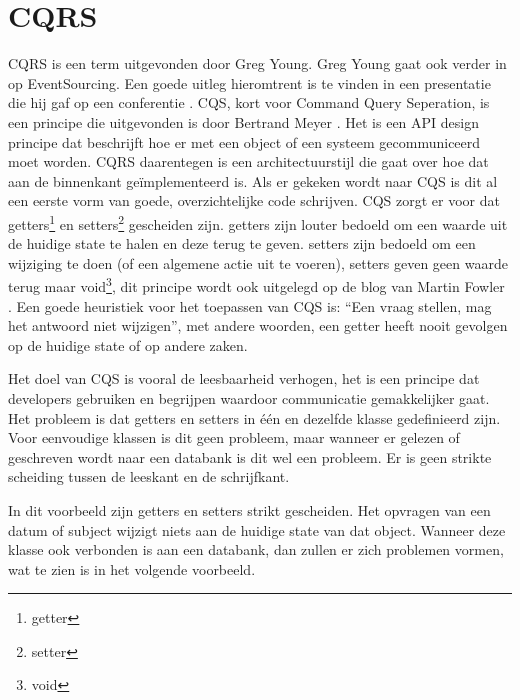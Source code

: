
\chapter{CQRS}
\label{ch:CQRS}

\gls{CQRS} is een term uitgevonden door Greg Young. Greg Young gaat ook verder in op EventSourcing. Een goede uitleg hieromtrent is te vinden in een presentatie die hij gaf op een conferentie \autocite{Young2014CQRSandES}. \gls{CQS}, kort voor Command Query Seperation, is een principe die uitgevonden is door Bertrand Meyer \autocite{Meyer1988}. Het is een API design principe dat beschrijft hoe er met een object of een systeem gecommuniceerd moet worden. CQRS daarentegen is een architectuurstijl die gaat over hoe dat aan de binnenkant geïmplementeerd is. Als er gekeken wordt naar \gls{CQS} is dit al een eerste vorm van goede, overzichtelijke code schrijven. \gls{CQS} zorgt er voor dat \glspl{getter}\footnote{\glsdesc{getter}} en \glspl{setter}\footnote{\glsdesc{setter}} gescheiden zijn. \Glspl{getter} zijn louter bedoeld om een waarde uit de huidige state te halen en deze terug te geven. \Glspl{setter} zijn bedoeld om een wijziging te doen (of een algemene actie uit te voeren), \glspl{setter} geven geen waarde terug maar \gls{void}\footnote{\glsdesc{void}}, dit principe wordt ook uitgelegd op de blog van Martin Fowler \autocite{Fowler2005CQS}. Een goede heuristiek voor het toepassen van \gls{CQS} is: ``Een vraag stellen, mag het antwoord niet wijzigen'', met andere woorden, een \gls{getter} heeft nooit gevolgen op de huidige state of op andere zaken.

Het doel van \gls{CQS} is vooral de leesbaarheid verhogen, het is een principe dat developers gebruiken en begrijpen waardoor communicatie gemakkelijker gaat.
Het probleem is dat \glspl{getter} en \glspl{setter} in één en dezelfde klasse gedefinieerd zijn. Voor eenvoudige klassen is dit geen probleem, maar wanneer er gelezen of geschreven wordt naar een databank is dit wel een probleem. Er is geen strikte scheiding tussen de leeskant en de schrijfkant.


In dit voorbeeld zijn \glspl{getter} en \glspl{setter} strikt gescheiden. Het opvragen van een datum of subject wijzigt niets aan de huidige state van dat object. Wanneer deze klasse ook verbonden is aan een databank, dan zullen er zich problemen vormen, wat te zien is in het volgende voorbeeld.

